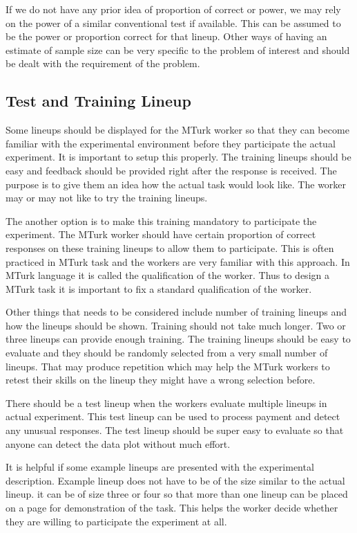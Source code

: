 \documentclass[11pt]{article}
\begin{document}
If we do not have any prior idea of proportion of correct or power, we may rely on the power of a similar conventional test if available. This can be assumed to be the power or proportion correct for that lineup. Other ways of having an estimate of sample size can be very specific to the problem of interest and should be dealt with the requirement of the problem.

\subsection{Test and Training Lineup} Some lineups should be displayed for the MTurk worker so that they can become familiar with the experimental environment before they participate the actual experiment. It is important to setup this properly. The training lineups should be easy and feedback should be provided right after the response is received. The purpose is to give them an idea how the actual task would look like. The worker may or may not like to try the training lineups.

The another option is to make this training mandatory to participate the experiment. The MTurk worker should have certain proportion of correct responses on these training lineups to allow them to participate. This is often practiced in MTurk task and the workers are very familiar with this approach. In MTurk language it is called the qualification of the worker. Thus to design a MTurk task it is important to fix a standard qualification of the worker.

Other things that needs to be considered include number of training lineups and how the lineups should be shown. Training should not take much longer. Two or three lineups can provide enough training. The training lineups should be easy to evaluate and they should be randomly selected from a very small number of lineups. That may produce repetition which may help the MTurk workers to retest their skills on the lineup they might have a wrong selection before. 

There should be a test lineup when the workers evaluate multiple lineups in actual experiment. This test lineup can be used to process payment and detect any unusual responses. The test lineup should be super easy to evaluate so that anyone can detect the data plot without much effort.

It is helpful if some example lineups are presented with the experimental description. Example lineup does not have to be of the size similar to the actual lineup. it can be of size three or four so that more than one lineup can be placed on a page for demonstration of the task. This helps the worker decide whether they are willing to participate the experiment at all.
\end{document}
